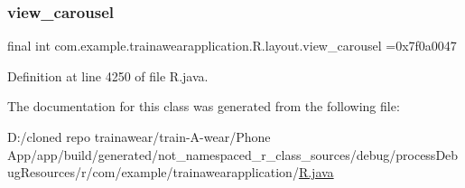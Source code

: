 \subsubsection{\texorpdfstring{view\_carousel}{view\_carousel}}
{\footnotesize\ttfamily final int com.\+example.\+trainawearapplication.\+R.\+layout.\+view\+\_\+carousel =0x7f0a0047\hspace{0.3cm}{\ttfamily [static]}}



Definition at line 4250 of file R.\+java.



The documentation for this class was generated from the following file\+:\begin{DoxyCompactItemize}
\item 
D\+:/cloned repo trainawear/train-\/\+A-\/wear/\+Phone App/app/build/generated/not\+\_\+namespaced\+\_\+r\+\_\+class\+\_\+sources/debug/process\+Debug\+Resources/r/com/example/trainawearapplication/\mbox{\hyperlink{process_debug_resources_2r_2com_2example_2trainawearapplication_2_r_8java}{R.\+java}}\end{DoxyCompactItemize}
